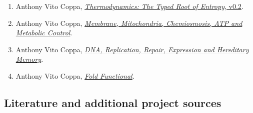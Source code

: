 \begin{enumerate}
\item
  Anthony Vito Coppa, \href{https://github.com/Coppalini-Architecture/coppalini-architecture/blob/9b7122ca5c3712c2c294e2bc5097276d0ba9817b/papers/10\%20THERMODYNAMICS_The_Typed_Root_of_Entropy_v0_2.md}{\emph{Thermodynamics: The Typed Root of Entropy}, v0.2}.
\item
  Anthony Vito Coppa, \href{https://github.com/Coppalini-Architecture/coppalini-architecture/blob/9b7122ca5c3712c2c294e2bc5097276d0ba9817b/papers/13\%20MEMBRANE_MITOCHONDRIA_CHEMIOSMOSIS_ATP_METABOLIC_CONTROL_v0_1.md}{\emph{Membrane, Mitochondria, Chemiosmosis, ATP and Metabolic Control}}.
\item
  Anthony Vito Coppa, \href{https://github.com/Coppalini-Architecture/coppalini-architecture/blob/9b7122ca5c3712c2c294e2bc5097276d0ba9817b/papers/14\%20DNA_REPLICATION_REPAIR_EXPRESSION_HEREDITARY_MEMORY_v0_1.md}{\emph{DNA, Replication, Repair, Expression and Hereditary Memory}}.
\item
  Anthony Vito Coppa, \href{https://chatgpt.com/library?file_id=libfile_c45a658f83988191a4057b320f6b5048\&account_id=personal}{\emph{Fold Functional}}.
\end{enumerate}

\hypertarget{literature-and-additional-project-sources}{%
\subsection*{Literature and additional project sources}\label{literature-and-additional-project-sources}}

